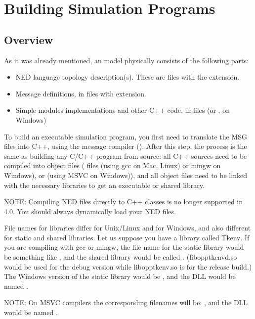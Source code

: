 \chapter{Building Simulation Programs}
\label{cha:building-simulation-programs}

\section{Overview}

As it was already mentioned, an {\opp} model physically consists of
the following parts:

\begin{itemize}
  \item{NED language topology description(s). These
      are files with the  extension.}
  \item{Message definitions, in files
      with  extension.}
  \item{Simple modules implementations and other C++ code, in 
        files (or , on Windows)}
\end{itemize}


To build an executable simulation program,
you first need to translate the MSG files
into C++, using the message compiler ().
After this step, the process is the same as building any C/C++
program from source: all C++ sources need to be compiled into object files
( files (using gcc on Mac, Linux) or mingw on Windows), or  (using MSVC on Windows)),
and all object files need to be linked with the necessary libraries to get
an executable or shared library.

NOTE: Compiling NED files directly to C++ classes is no longer supported in 
{\opp} 4.0. You should always dynamically load your NED files.

File names for libraries differ for Unix/Linux and for Windows,
and also different for static and shared libraries.
Let us suppose you have a library called Tkenv.
If you are compiling with gcc or mingw, the file name for the static library
would be something like ,
and the shared library would be called .
(libopptkenvd.so would be used for the debug version while libopptkenv.so
is for the release build.) The Windows version of the static library would 
be , and the DLL would be named .

NOTE: On MSVC compilers the corresponding filenames will be: 
, and the DLL would be named .

